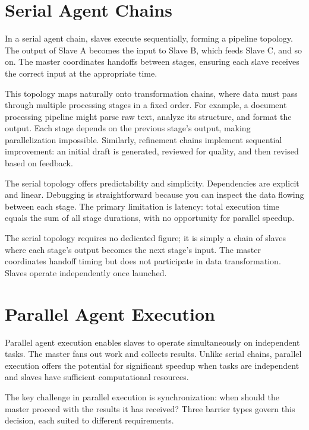 
\section{Serial Agent Chains}\label{sec:serial}

In a serial agent chain, slaves execute sequentially, forming a pipeline topology. The output of Slave A becomes the input to Slave B, which feeds Slave C, and so on. The master coordinates handoffs between stages, ensuring each slave receives the correct input at the appropriate time.

This topology maps naturally onto transformation chains, where data must pass through multiple processing stages in a fixed order. For example, a document processing pipeline might parse raw text, analyze its structure, and format the output. Each stage depends on the previous stage's output, making parallelization impossible. Similarly, refinement chains implement sequential improvement: an initial draft is generated, reviewed for quality, and then revised based on feedback.

The serial topology offers predictability and simplicity. Dependencies are explicit and linear. Debugging is straightforward because you can inspect the data flowing between each stage. The primary limitation is latency: total execution time equals the sum of all stage durations, with no opportunity for parallel speedup.

The serial topology requires no dedicated figure; it is simply a chain of slaves where each stage's output becomes the next stage's input. The master coordinates handoff timing but does not participate in data transformation. Slaves operate independently once launched.

\section{Parallel Agent Execution}\label{sec:parallel_agents}

Parallel agent execution enables slaves to operate simultaneously on independent tasks. The master fans out work and collects results. Unlike serial chains, parallel execution offers the potential for significant speedup when tasks are independent and slaves have sufficient computational resources.

The key challenge in parallel execution is synchronization: when should the master proceed with the results it has received? Three barrier types govern this decision, each suited to different requirements.

